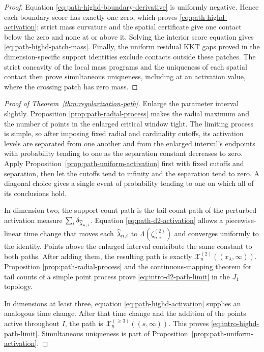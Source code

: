 \begin{proof}
Equation \eqref{eq:path-highd-boundary-derivative} is uniformly negative.
Hence each boundary score has exactly one zero, which proves
\eqref{eq:path-highd-activation}; strict mass curvature and the spatial
certificate give one contact below the zero and none at or above it. Solving
the interior score equation gives \eqref{eq:path-highd-patch-mass}. Finally,
the uniform residual KKT gaps proved in the dimension-specific support
identities exclude contacts outside these patches. The strict concavity of
the local mass programs and the uniqueness of each spatial contact then prove
simultaneous uniqueness, including at an activation value, where the crossing
patch has zero mass.
\end{proof}

\begin{proof}[Proof of Theorem~\ref{thm:regularization-path}]
Enlarge the parameter interval slightly. Proposition
\ref{prop:path-radial-process} makes the radial maximum and the number of
points in the enlarged critical window tight. The limiting process is simple,
so after imposing fixed radial and cardinality cutoffs, its activation levels
are separated from one another and from the enlarged interval's endpoints
with probability tending to one as the separation constant decreases to zero.
Apply Proposition~\ref{prop:path-uniform-activation} first with fixed cutoffs
and separation, then let the cutoffs tend to infinity and the separation tend
to zero. A diagonal choice gives a single event of probability tending to one
on which all of its conclusions hold.

In dimension two, the support-count path is the tail-count path of the
perturbed activation measure
\(\sum_i\delta_{\widehat\lambda_{n,i}}\). Equation
\eqref{eq:path-d2-activation} allows a piecewise-linear time change that moves
each \(\widehat\lambda_{n,i}\) to \(\Lambda(\zeta_{n,i}^{(2)})\) and converges
uniformly to the identity. Points above the enlarged interval contribute the
same constant to both paths. After adding them, the resulting path is exactly
\(\mathcal X_n^{(2)}((x_\lambda,\infty))\). Proposition
\ref{prop:path-radial-process} and the continuous-mapping theorem for tail
counts of a simple point process prove \eqref{eq:intro-d2-path-limit} in the
\(J_1\) topology.

In dimensions at least three, equation
\eqref{eq:path-highd-activation} supplies an analogous time change. After
that time change and the addition of
the points active throughout \(I\), the path is
\(\mathcal X_n^{(\ge3)}((s,\infty))\). This proves
\eqref{eq:intro-highd-path-limit}. Simultaneous uniqueness is part of
Proposition~\ref{prop:path-uniform-activation}.
\end{proof}

